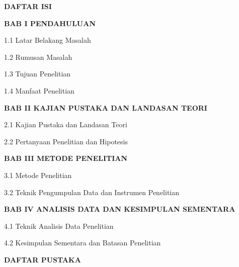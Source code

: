 \documentclass[
]{article}
\begin{document}
\noindent\textbf{DAFTAR ISI}\dotfill\textbf{\pageref{sec:daftar-isi}}\par
\vspace{0.6em}
\noindent\textbf{BAB I PENDAHULUAN}\dotfill\textbf{\pageref{sec:bab1}}\par
\vspace{0.2em}
\noindent\hspace*{1.5em}1.1 Latar Belakang Masalah\dotfill\pageref{sec:1.1}\par
\vspace{0.2em}
\noindent\hspace*{1.5em}1.2 Rumusan Masalah\dotfill\pageref{sec:1.2}\par
\vspace{0.2em}
\noindent\hspace*{1.5em}1.3 Tujuan Penelitian\dotfill\pageref{sec:1.3}\par
\vspace{0.2em}
\noindent\hspace*{1.5em}1.4 Manfaat Penelitian\dotfill\pageref{sec:1.4}\par
\vspace{0.6em}
\noindent\textbf{BAB II KAJIAN PUSTAKA DAN LANDASAN TEORI}\dotfill\textbf{\pageref{sec:bab2}}\par
\vspace{0.2em}
\noindent\hspace*{1.5em}2.1 Kajian Pustaka dan Landasan Teori\dotfill\pageref{sec:2.1}\par
\vspace{0.2em}
\noindent\hspace*{1.5em}2.2 Pertanyaan Penelitian dan Hipotesis\dotfill\pageref{sec:2.2}\par
\vspace{0.6em}
\noindent\textbf{BAB III METODE PENELITIAN}\dotfill\textbf{\pageref{sec:bab3}}\par
\vspace{0.2em}
\noindent\hspace*{1.5em}3.1 Metode Penelitian\dotfill\pageref{sec:3.1}\par
\vspace{0.2em}
\noindent\hspace*{1.5em}3.2 Teknik Pengumpulan Data dan Instrumen Penelitian\dotfill\pageref{sec:3.2}\par
\vspace{0.6em}
\noindent\textbf{BAB IV ANALISIS DATA DAN KESIMPULAN SEMENTARA}\dotfill\textbf{\pageref{sec:bab4}}\par
\vspace{0.2em}
\noindent\hspace*{1.5em}4.1 Teknik Analisis Data Penelitian\dotfill\pageref{sec:4.1}\par
\vspace{0.2em}
\noindent\hspace*{1.5em}4.2 Kesimpulan Sementara dan Batasan Penelitian\dotfill\pageref{sec:4.2}\par
\vspace{0.6em}
\noindent\textbf{DAFTAR PUSTAKA}\dotfill\textbf{\pageref{sec:daftar-pustaka}}\par
\end{document}
